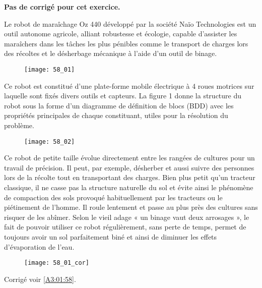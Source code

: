 \normaltrue \difficilefalse \tdifficilefalse
\correctiontrue

\setcounter{numques}{0}

\ifcorrection
\else
\textbf{Pas de corrigé pour cet exercice.}
\fi

\ifprof
\else

Le robot de maraîchage Oz 440 développé par la société Naïo Technologies est un outil autonome
agricole, alliant robustesse et écologie, capable d’assister les maraîchers dans les tâches les plus
pénibles comme le transport de charges lors des récoltes et le désherbage mécanique à l’aide d’un
outil de binage.


\begin{figure}[H]
\centering
\texttt{[image: 58\_01]}
\end{figure}


Ce robot est constitué d’une plate-forme mobile électrique à 4 roues motrices sur laquelle sont
fixés divers outils et capteurs. La figure 1 donne la structure du robot sous la forme d’un
diagramme de définition de blocs (BDD) avec les propriétés principales de chaque constituant,
utiles pour la résolution du problème.

\begin{figure}[H]
\centering
\texttt{[image: 58\_02]}
\end{figure}


Ce robot de petite taille évolue directement entre les rangées de cultures pour un travail de
précision. Il peut, par exemple, désherber et aussi suivre des personnes lors de la récolte tout en
transportant des charges. Bien plus petit qu’un tracteur classique, il ne casse pas la structure
naturelle du sol et évite ainsi le phénomène de compaction des sols provoqué habituellement par les
tracteurs ou le piétinement de l’homme. Il roule lentement et passe au plus près des cultures sans
risquer de les abîmer. Selon le vieil adage « un binage vaut deux arrosages », le fait de pouvoir
utiliser ce robot régulièrement, sans perte de temps, permet de toujours avoir un sol parfaitement
biné et ainsi de diminuer les effets d’évaporation de l’eau.
\fi

\ifprof

\begin{figure}[H]
\centering
\texttt{[image: 58\_01\_cor]}
\end{figure}

\else
\begin{flushright}
\footnotesize{Corrigé  voir \ref{A3:01:58}.}
\end{flushright}%
\fi